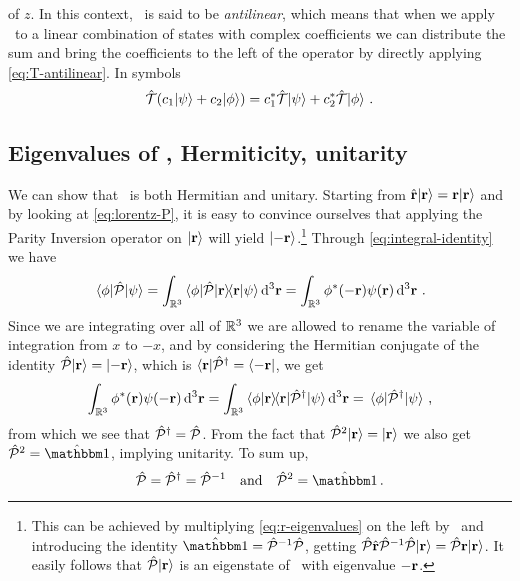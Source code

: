         of $z$. In this context, \hT\ is said to be \emph{antilinear}, which means that when we apply \hT\ to a linear combination of states with complex coefficients we can distribute the sum and bring the coefficients to the left of the operator by directly applying \eqref{eq:T-antilinear}. In symbols
        \begin{equation*}
            \hT\pqty{c_1\!\ket{\psi} + c_2\!\ket{\phi}}
            = c_1^* \hT\!\ket{\psi} + c_2^* \hT\!\ket{\phi}
            \myperiod
        \end{equation*}

        \subsection{Eigenvalues of \hP, Hermiticity, unitarity}
            We can show that \hP\ is both Hermitian and unitary. Starting from $\hat{\vb{r}}\!\ket{\vb{r}} = \vb{r}\!\ket{\vb{r}}$ and by looking at \eqref{eq:lorentz-P}, it is easy to convince ourselves that applying the Parity Inversion operator on $\ket{\vb{r}}$ will yield $\ket{-\vb{r}}$.\footnote{This can be achieved by multiplying \eqref{eq:r-eigenvalues} on the left by \hP\ and introducing the identity $\hidM = \hP^{-1}\hP$, getting $\mathcal{\hat{P}}\hat{\vb{r}}\mathcal{\hat{P}}^{-1}\mathcal{\hat{P}}\!\ket{\vb{r}} = \mathcal{\hat{P}}\vb{r}\!\ket{\vb{r}}$. It easily follows that $\mathcal{\hat{P}}\!\ket{\vb{r}}$ is an eigenstate of \hvr\ with eigenvalue $-\vb{r}$.} Through \eqref{eq:integral-identity} we have
            \begin{equation*}
                \mel{\phi}{\hP}{\psi}
                = \int\nolimits_{\bbR^3}\bra{\phi}\!\hP\!\ket{\vb{r}}\!\!\bra{\vb{r}}\ket{\psi}\dd[3]{\vb{r}}
                = \int\nolimits_{\bbR^3}\phi^*\pqty{-\vb{r}}\psi\pqty{\vb{r}}\dd[3]{\vb{r}}
                \myperiod
            \end{equation*}
            Since we are integrating over all of $\mathbb{R}^3$ we are allowed to rename the variable of integration from $x$ to $-x$, and by considering the Hermitian conjugate of the identity $\mathcal{\hat{P}}\!\ket{\vb{r}} = \ket{-\vb{r}}$, which is $\bra{\vb{r}}\!\mathcal{\hat{P}}^\dag = \bra{-\vb{r}}$, we get
            \begin{equation*}
                \int\nolimits_{\bbR^3}\phi^*\pqty{\vb{r}}\psi\pqty{-\vb{r}}\dd[3]{\vb{r}}
                = \int\nolimits_{\bbR^3}\bra{\phi}\ket{\vb{r}}\!\!\bra{\vb{r}}\!\hP^\dag\!\ket{\psi}\dd[3]{\vb{r}}
                = \mel{\phi}{\hP^\dag}{\psi}
                \mycomma
            \end{equation*}
            from which we see that $\mathcal{\hat{P}}^\dag = \mathcal{\hat{P}}$. From the fact that $\mathcal{\hat{P}}^2\!\ket{\vb{r}} = \ket{\vb{r}}$ we also get $\hP^2 = \hidM$, implying unitarity. To sum up,
            \begin{equation}
                \label{eq:P-properties}
                \hP
                = \hP^\dag
                = \hP^{-1}
                \qand
                \hP^2
                = \togglehat{\idM}
                \myperiod
            \end{equation}

